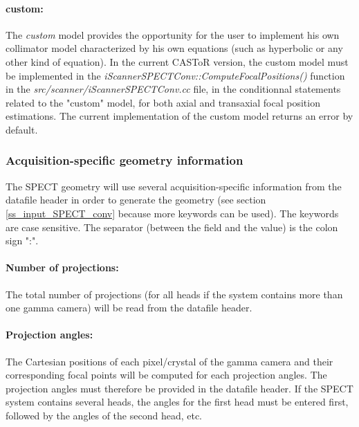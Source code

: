 \documentclass[a4paper, 11pt]{article}
\begin{document}
\paragraph{custom:}

The \textit{custom} model provides the opportunity for the user to implement his own collimator model characterized by his own equations
(such as hyperbolic or any other kind of equation). In the current CASToR version, the custom model must be implemented in the
\textit{iScannerSPECTConv::ComputeFocalPositions()} function in the \textit{src/scanner/iScannerSPECTConv.cc} file, in the conditionnal
statements related to the "custom" model, for both axial and transaxial focal position estimations. The current implementation of the
custom model returns an error by default.

\subsubsection{Acquisition-specific geometry information}
\label{sss_SPECT_conv_acquisition_data}

The SPECT geometry will use several acquisition-specific information from the datafile header in order to generate the geometry (see
section \ref{ss_input_SPECT_conv} because more keywords can be used).
The keywords are case sensitive.
The separator (between the field and the value) is the colon sign ":".

\paragraph{Number of projections:}

The total number of projections (for all heads if the system contains more than one gamma camera) will be read from the datafile header.

\paragraph{Projection angles:}

The Cartesian positions of each pixel/crystal of the gamma camera and their corresponding focal points will be computed for each projection
angles. The projection angles must therefore be provided in the datafile header. If the SPECT system contains several heads, the angles for
the first head must be entered first, followed by the angles of the second head, etc.
\end{document}
